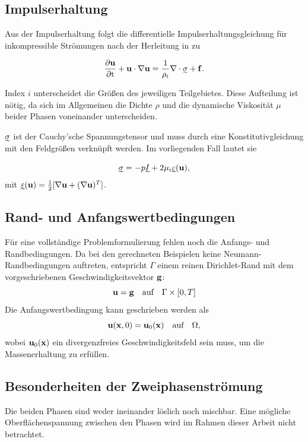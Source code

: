 \subsection{Impulserhaltung}
Aus der Impulserhaltung folgt die differentielle Impulserhaltungsgleichung für inkompressible Strömungen nach der Herleitung in \cite{gravemeier} zu

\begin{equation}
	\partt{\vect{u}} + \vect{u}\cdot\nabla\vect{u}=\frac{1}{\rho_i}\nabla\cdot\tens{\sigma}+\vect{f}.
\end{equation}

Index $i$ unterscheidet die Größen des jeweiligen Teilgebietes. Diese Aufteilung ist nötig, da sich im Allgemeinen die Dichte $\rho$ und die dynamische Viskosität $\mu$ beider Phasen voneinander unterscheiden.

\(\tens{\sigma}\) ist der Cauchy'sche Spannungstensor und muss durch eine Konstitutivgleichung mit den Feldgrößen verknüpft werden. Im vorliegenden Fall lautet sie

\begin{equation}
	\tens{\sigma} = -p\tens{I} + 2\mu_i\tens{\varepsilon}(\vect{u}),
\end{equation}
mit \(\tens{\varepsilon}(\vect{u})
=\frac{1}{2}[\nabla\vect{u} + (\nabla\vect{u})^T]\).

\subsection{Rand- und Anfangswertbedingungen}
Für eine vollständige Problemformulierung fehlen noch die Anfangs- und Randbedingungen. Da bei den gerechneten Beispielen keine Neumann-Randbedingungen auftreten, entspricht $\Gamma$ einem reinen Dirichlet-Rand mit dem vorgeschriebenen Geschwindigkeitsvektor $\mathbf{g}$:
\begin{equation}
 \mathbf{u} = \mathbf{g} \quad\text{auf}\quad \Gamma \times [0,T]
\end{equation}
Die Anfangswertbedingung kann geschrieben werden als
\begin{equation}
 \mathbf{u}(\mathbf{x},0) = \mathbf{u}_0(\mathbf{x}) \quad\text{auf}\quad \Omega,
\end{equation}
wobei $\mathbf{u}_0(\mathbf{x})$ ein divergenzfreies Geschwindigkeitsfeld sein muss, um die Massenerhaltung zu erfüllen.


\subsection{Besonderheiten der Zweiphasenströmung}
\label{sec:twophaseflow}
Die beiden Phasen sind weder ineinander löslich noch mischbar. Eine mögliche Oberflächenspannung zwischen den Phasen wird im Rahmen dieser Arbeit nicht betrachtet.\\

